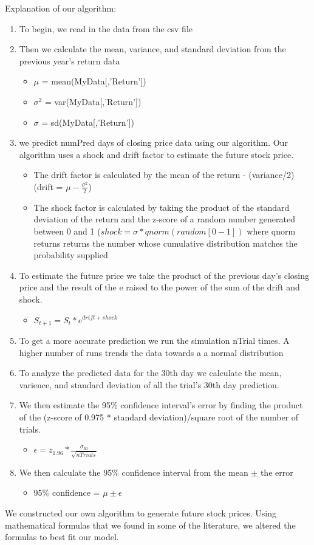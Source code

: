 \documentclass{article}
\begin{document}
Explanation of our algorithm:
\begin{enumerate}
\item To begin, we read in the data from the csv file
\item Then we calculate the mean, variance, and standard deviation from the previous year's return data
\begin{itemize}
\item $\mu$ = mean(MyData[,'Return'])
\item $\sigma^2$ = var(MyData[,'Return'])
\item $\sigma$ = sd(MyData[,'Return'])
\end{itemize}
\item we predict numPred days of closing price data using our algorithm. Our algorithm uses a shock and drift factor to estimate the future stock price.
\begin{itemize}
\item  The drift factor is calculated by the mean of the return - (variance/2)
(drift = $\mu - \frac{\sigma^2}{2}$)
\item The shock factor is calculated by taking the product of the standard deviation of the return and the z-score of a random number generated between 0 and 1 ($shock = \sigma*qnorm(random[0-1])$ where qnorm returns returns the number whose cumulative distribution matches the probability supplied 
\end{itemize}
\item To estimate the future price we take the product of the previous day's closing price and the result of the e raised to the power of the sum of the drift and shock. 
\begin{itemize}
\item $S_{t+1} = S_t*e^{drift + shock}$
\end{itemize}
\item To get a more accurate prediction we run the simulation nTrial times. A higher number of runs trends the data towards a a normal distribution
\item To analyze the predicted data for the 30th day we calculate the mean, varience, and standard deviation of all the trial's 30th day prediction.
\item We then estimate the 95\% confidence interval's error by finding the product of the (z-score of 0.975 * standard deviation)/square root of the number of trials. 
\begin{itemize}
\item $\epsilon = z_{1.96}*\frac{\sigma_{30}}{\sqrt{nTrials}}$
\end{itemize}
\item We then calculate the 95\% confidence interval from the mean $\pm$ the error
\begin{itemize}
\item 95\% confidence = $\mu \pm \epsilon$
\end{itemize}
\end{enumerate}
\text We constructed our own algorithm to generate future stock prices. Using mathematical formulas that we found in some of the literature, we altered the formulas to best fit our model. 
\end{document}
